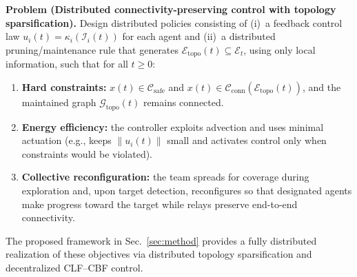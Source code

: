 \noindent\textbf{Problem (Distributed connectivity-preserving control with topology sparsification).}
Design distributed policies consisting of (i)~a feedback control law $u_i(t)=\kappa_i(\mathcal{I}_i(t))$ for each agent and (ii)~a distributed pruning/maintenance rule that generates $\mathcal{E}_{\mathrm{topo}}(t)\subseteq\mathcal{E}_t$, using only local information, such that for all $t\ge 0$:
\begin{enumerate}
    \item \textbf{Hard constraints:} $x(t)\in\mathcal{C}_{\mathrm{safe}}$ and $x(t)\in\mathcal{C}_{\mathrm{conn}}(\mathcal{E}_{\mathrm{topo}}(t))$, and the maintained graph $\mathcal{G}_{\mathrm{topo}}(t)$ remains connected.
    \item \textbf{Energy efficiency:} the controller exploits advection and uses minimal actuation (e.g., keeps $\|u_i(t)\|$ small and activates control only when constraints would be violated).
    \item \textbf{Collective reconfiguration:} the team spreads for coverage during exploration and, upon target detection, reconfigures so that designated agents make progress toward the target while relays preserve end-to-end connectivity.
\end{enumerate}

The proposed framework in Sec.~\ref{sec:method} provides a fully distributed realization of these objectives via distributed topology sparsification and decentralized CLF--CBF control.
